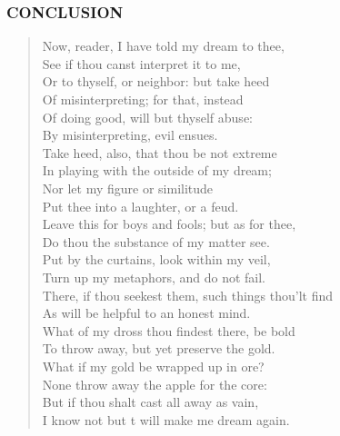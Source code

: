 \newpage
\subsubsection{CONCLUSION}
\begin{verse}
Now, reader, I have told my dream to thee,\\
See if thou canst interpret it to me,\\
Or to thyself, or neighbor: but take heed\\
Of misinterpreting; for that, instead\\
Of doing good, will but thyself abuse:\\
By misinterpreting, evil ensues.\\
Take heed, also, that thou be not extreme\\
In playing with the outside of my dream;\\
Nor let my figure or similitude\\
Put thee into a laughter, or a feud.\\
Leave this for boys and fools; but as for thee,\\
Do thou the substance of my matter see.\\
Put by the curtains, look within my veil,\\
Turn up my metaphors, and do not fail.\\
There, if thou seekest them, such things thou'lt find\\
As will be helpful to an honest mind.\\
What of my dross thou findest there, be bold\\
To throw away, but yet preserve the gold.\\
What if my gold be wrapped up in ore?\\
None throw away the apple for the core:\\
But if thou shalt cast all away as vain,\\
I know not but t will make me dream again.\\
\end{verse}
